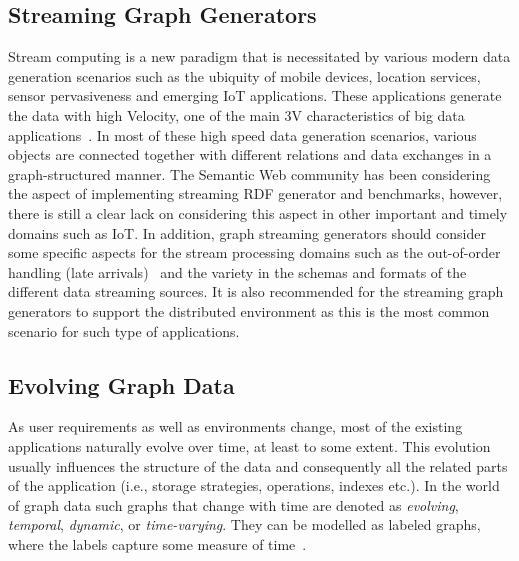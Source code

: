 \subsection{Streaming Graph Generators}
Stream computing is a new paradigm that is necessitated by various modern data generation scenarios such as the ubiquity of mobile devices, location services,
sensor pervasiveness and emerging IoT applications. These applications generate the data with high Velocity, one of the main 3V characteristics of big data applications~\cite{sakr2016big}. In most of these high speed data generation scenarios, various objects are connected together with different relations and data exchanges  in a graph-structured manner. The Semantic Web community has been considering the aspect of implementing streaming RDF generator and benchmarks, however, there is still a clear lack on considering this aspect in other important and timely domains such as IoT. %
In addition, graph streaming generators should  consider some specific aspects for the stream processing domains such as the out-of-order handling (late arrivals)~\cite{li2008out} and the variety in the schemas and formats of the different data streaming sources. It is also recommended for the streaming graph generators to support the distributed environment as this is the most common scenario for such type of applications.

\subsection{Evolving Graph Data}
As user requirements as well as environments change, most of the existing
applications naturally evolve over time, at least to some extent. This evolution
usually influences the structure of the data and consequently all the related
parts of the application (i.e., storage strategies, operations, indexes etc.).
In the world of graph data such graphs that change with time are denoted as \emph{evolving}, \emph{temporal}, \emph{dynamic}, or \emph{time-varying}. They can be modelled as labeled graphs, where the labels capture some measure of time~\cite{Michail2015}.

